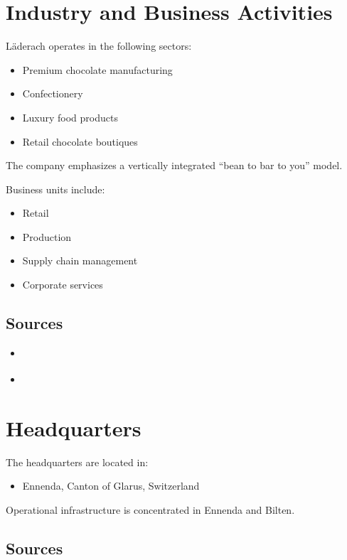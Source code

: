 \section{Industry and Business Activities}

Läderach operates in the following sectors:

\begin{itemize}
    \item Premium chocolate manufacturing
    \item Confectionery
    \item Luxury food products
    \item Retail chocolate boutiques
\end{itemize}

The company emphasizes a vertically integrated ``bean to bar to you'' model.

Business units include:

\begin{itemize}
    \item Retail
    \item Production
    \item Supply chain management
    \item Corporate services
\end{itemize}

\subsection*{Sources}

\begin{itemize}
    \item \cite{wikipediaLaederach}
    \item \cite{laderachOurBusinessUnits}
\end{itemize}

\section{Headquarters}

The headquarters are located in:

\begin{itemize}
    \item Ennenda, Canton of Glarus, Switzerland
\end{itemize}

Operational infrastructure is concentrated in Ennenda and Bilten.

\subsection*{Sources}

